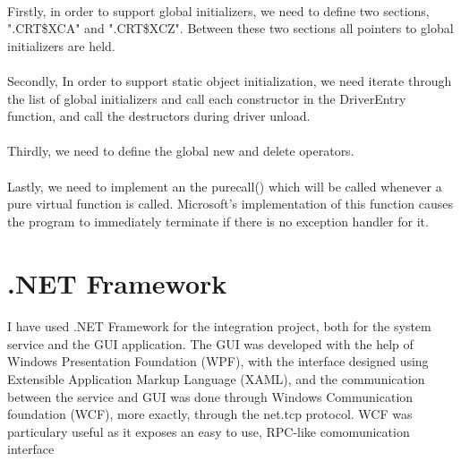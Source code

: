         \paragraph{}
        Firstly, in order to support global initializers, we need to define two sections, ".CRT\$XCA" and ".CRT\$XCZ". Between these two
        sections all pointers to global initializers are held.

        \paragraph{}
        Secondly, In order to support static object initialization, we need iterate through the list of global initializers and call each
        constructor in the DriverEntry function, and call the destructors during driver unload.

        \paragraph{}
        Thirdly, we need to define the global new and delete operators.

        \paragraph{}
        Lastly, we need to implement an the \textunderscore purecall() which will be called whenever a pure virtual function is called. Microsoft's implementation
        of this function causes the program to immediately terminate if there is no exception handler for it.

    \section{.NET Framework}
        \paragraph{}
        I have used .NET Framework for the integration project, both for the system service and the GUI application. The GUI was developed with
        the help of Windows Presentation Foundation (WPF), with the interface designed using Extensible Application Markup Language (XAML), and
        the communication between the service and GUI was done through Windows Communication foundation (WCF), more exactly, through the
        net.tcp protocol. WCF was particulary useful as it exposes an easy to use, RPC-like comomunication interface


